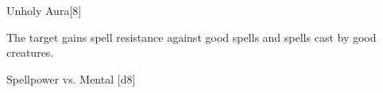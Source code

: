 
\begin{spellsection}{Unholy Aura}[8]
    \begin{spellheader}
    \end{spellheader}
    \begin{spellcontent}
        \begin{spelltargetinginfo}
        \end{spelltargetinginfo}
        \begin{spelleffects}
            \spelleffect The target gains spell resistance against good spells and spells cast by good creatures.
            \spelldur \durshort \dismissable
        \end{spelleffects}
    \end{spellcontent}
    \begin{spellsubcontent}
        \begin{spelltargetinginfo}
        \end{spelltargetinginfo}
        \begin{spelleffects}
            \begin{spellattack}{Spellpower vs. Mental}
                \spellsuccess {}[d8]
            \end{spellattack}
        \end{spelleffects}
    \end{spellsubcontent}
    \begin{spellfooter}
        \miscastexplode
    \end{spellfooter}
\end{spellsection}

